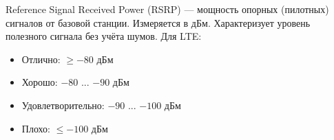 Reference Signal Received Power (RSRP) — мощность опорных (пилотных) сигналов от базовой станции. Измеряется в дБм. Характеризует уровень полезного сигнала без учёта шумов. Для LTE: \cite{rssi}
\begin{itemize}
    \item Отлично: $\geq -80$ дБм
    \item Хорошо: $-80$ ... $-90$ дБм
    \item Удовлетворительно: $-90$ ... $-100$ дБм
    \item Плохо: $\leq -100$ дБм
\end{itemize}

\endinput